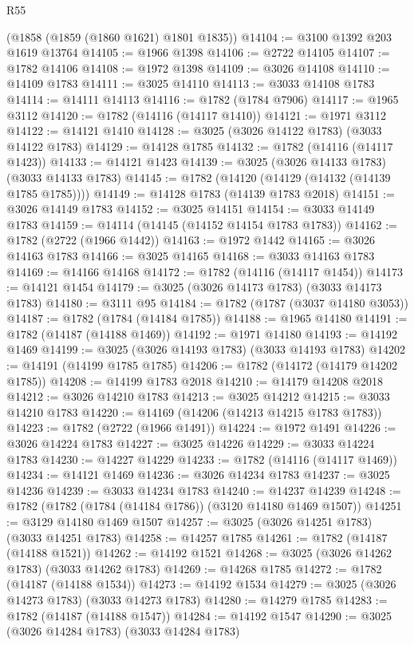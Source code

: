\begin{lexlean}{R55}
\begin{coremodule}
    (@1858 (@1859 (@1860 @1621) @1801 @1835))
@14104 := @3100 @1392 @203 @1619 @13764
@14105 := @1966 @1398
@14106 := @2722 @14105
@14107 := @1782 @14106
@14108 := @1972 @1398
@14109 := @3026 @14108
@14110 := @14109 @1783
@14111 := @3025 @14110
@14113 := @3033 @14108 @1783
@14114 := @14111 @14113
@14116 := @1782 (@1784 @7906)
@14117 := @1965 @3112
@14120 := @1782 (@14116 (@14117 @1410))
@14121 := @1971 @3112
@14122 := @14121 @1410
@14128 := @3025 (@3026 @14122 @1783) (@3033 @14122 @1783)
@14129 := @14128 @1785
@14132 := @1782 (@14116 (@14117 @1423))
@14133 := @14121 @1423
@14139 := @3025 (@3026 @14133 @1783) (@3033 @14133 @1783)
@14145 := @1782 (@14120 (@14129 (@14132 (@14139 @1785 @1785))))
@14149 := @14128 @1783 (@14139 @1783 @2018)
@14151 := @3026 @14149 @1783
@14152 := @3025 @14151
@14154 := @3033 @14149 @1783
@14159 := @14114 (@14145 (@14152 @14154 @1783 @1783))
@14162 := @1782 (@2722 (@1966 @1442))
@14163 := @1972 @1442
@14165 := @3026 @14163 @1783
@14166 := @3025 @14165
@14168 := @3033 @14163 @1783
@14169 := @14166 @14168
@14172 := @1782 (@14116 (@14117 @1454))
@14173 := @14121 @1454
@14179 := @3025 (@3026 @14173 @1783) (@3033 @14173 @1783)
@14180 := @3111 @95
@14184 := @1782 (@1787 (@3037 @14180 @3053))
@14187 := @1782 (@1784 (@14184 @1785))
@14188 := @1965 @14180
@14191 := @1782 (@14187 (@14188 @1469))
@14192 := @1971 @14180
@14193 := @14192 @1469
@14199 := @3025 (@3026 @14193 @1783) (@3033 @14193 @1783)
@14202 := @14191 (@14199 @1785 @1785)
@14206 := @1782 (@14172 (@14179 @14202 @1785))
@14208 := @14199 @1783 @2018
@14210 := @14179 @14208 @2018
@14212 := @3026 @14210 @1783
@14213 := @3025 @14212
@14215 := @3033 @14210 @1783
@14220 := @14169 (@14206 (@14213 @14215 @1783 @1783))
@14223 := @1782 (@2722 (@1966 @1491))
@14224 := @1972 @1491
@14226 := @3026 @14224 @1783
@14227 := @3025 @14226
@14229 := @3033 @14224 @1783
@14230 := @14227 @14229
@14233 := @1782 (@14116 (@14117 @1469))
@14234 := @14121 @1469
@14236 := @3026 @14234 @1783
@14237 := @3025 @14236
@14239 := @3033 @14234 @1783
@14240 := @14237 @14239
@14248 := @1782 (@1782 (@1784 (@14184 @1786)) (@3120 @14180 @1469 @1507))
@14251 := @3129 @14180 @1469 @1507
@14257 := @3025 (@3026 @14251 @1783) (@3033 @14251 @1783)
@14258 := @14257 @1785
@14261 := @1782 (@14187 (@14188 @1521))
@14262 := @14192 @1521
@14268 := @3025 (@3026 @14262 @1783) (@3033 @14262 @1783)
@14269 := @14268 @1785
@14272 := @1782 (@14187 (@14188 @1534))
@14273 := @14192 @1534
@14279 := @3025 (@3026 @14273 @1783) (@3033 @14273 @1783)
@14280 := @14279 @1785
@14283 := @1782 (@14187 (@14188 @1547))
@14284 := @14192 @1547
@14290 := @3025 (@3026 @14284 @1783) (@3033 @14284 @1783)

\end{coremodule}
\end{lexlean}
